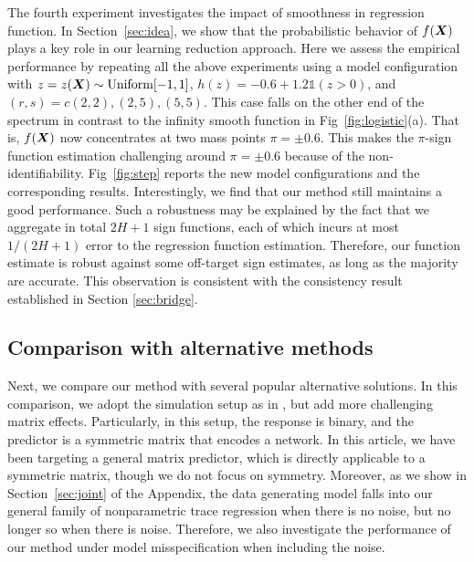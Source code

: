 \documentclass[11pt]{article}
\theoremstyle{plain}
\theoremstyle{definition}
\begin{document}
The fourth experiment investigates the impact of smoothness in regression function. In Section~\ref{sec:idea}, we show that the probabilistic behavior of $f(\bm X)$ plays a key role in our learning reduction approach. Here we assess the empirical performance by repeating all the above experiments using a model configuration with $z=z(\bm X)\sim \text{Uniform}[-1,1]$, $h(z)=-0.6+1.2\mathds{1}(z>0)$, and $(r,s)=c(2,2),(2,5),(5,5)$. This case falls on the other end of the spectrum in contrast to the infinity smooth function in Fig~\ref{fig:logistic}(a). That is, $f(\bm X)$ now concentrates at two mass points $\pi=\pm 0.6$. This makes the $\pi$-sign function estimation challenging around $\pi=\pm 0.6$ because of the non-identifiability. Fig~\ref{fig:step} reports the new model configurations and the corresponding results. Interestingly, we find that our method still maintains a good performance. Such a robustness may be explained by the fact that we aggregate in total $2H+1$ sign functions, each of which incurs at most $1/(2H+1)$ error to the regression function estimation. Therefore, our function estimate is robust against some off-target sign estimates, as long as the majority are accurate. This observation is consistent with the consistency result established in Section \ref{sec:bridge}.



\subsection{Comparison with alternative methods}
\label{sec:comparison}

Next, we compare our method with several popular alternative solutions. In this comparison, we adopt the simulation setup as in \cite{relion2019network}, but add more challenging matrix effects. Particularly, in this setup, the response is binary, and the predictor is a symmetric matrix that encodes a network. In this article, we have been targeting a general matrix predictor, which is directly applicable to a symmetric matrix, though we do not focus on symmetry. Moreover, as we show in Section~\ref{sec:joint} of the Appendix, the data generating model falls into our general family of nonparametric trace regression when there is no noise, but no longer so when there is noise. Therefore, we also investigate the performance of our method under model misspecification when including the noise. 
\end{document}
